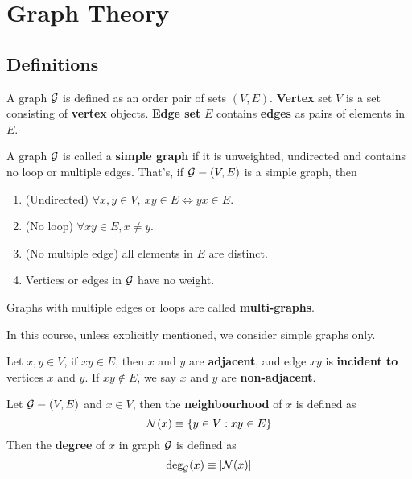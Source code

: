 \documentclass{article}
\begin{document}
	\section{Graph Theory}
		\subsection{Definitions}
		\begin{definition}
			A graph $\mathcal{{G}}$ is defined as an order pair of sets $(V, E)$. \textbf{Vertex} set $V$ is a set consisting of \textbf{vertex} objects. \textbf{Edge set} $E$ contains \textbf{edges} as pairs of elements in $E$.
		\end{definition}
		
		\begin{definition}
			A graph $\mathcal{{G}}$ is called a \textbf{simple graph} if it is unweighted, undirected and contains no loop or multiple edges. That's, if $\mathcal{{G}} \equiv (V, E)$ is a simple graph, then
			\begin{enumerate}
				\item (Undirected) $\forall x, y \in V,\ xy \in E \iff yx \in E$.
				\item (No loop) $\forall xy \in E, x \neq y$.
				\item (No multiple edge) all elements in $E$ are distinct.
				\item Vertices or edges in $\mathcal{{G}}$ have no weight.
			\end{enumerate}
			Graphs with multiple edges or loops are called \textbf{multi-graphs}.
		\end{definition}
		
		\begin{remark}
			In this course, unless explicitly mentioned, we consider simple graphs only.
		\end{remark}
		
		\begin{definition}
			Let $x, y \in V$, if $xy \in E$, then $x$ and $y$ are \textbf{adjacent}, and edge $xy$ is \textbf{incident to} vertices $x$ and $y$. If $xy \notin E$, we say $x$ and $y$ are \textbf{non-adjacent}.
		\end{definition}
		
		\begin{definition}
			Let $\mathcal{{G}} \equiv (V, E)$ and $x \in V$, then the \textbf{neighbourhood} of $x$ is defined as
			\begin{equation}
				\mathcal{{N}}(x) \equiv \{y \in V: xy \in E\}
			\end{equation}
			Then the \textbf{degree} of $x$ in graph $\mathcal{{G}}$ is defined as
			\begin{equation}
				\text{{deg}}_{\mathcal{{G}}}(x) \equiv |\mathcal{{N}}(x)|
			\end{equation}
		\end{definition}
		
\end{document}
